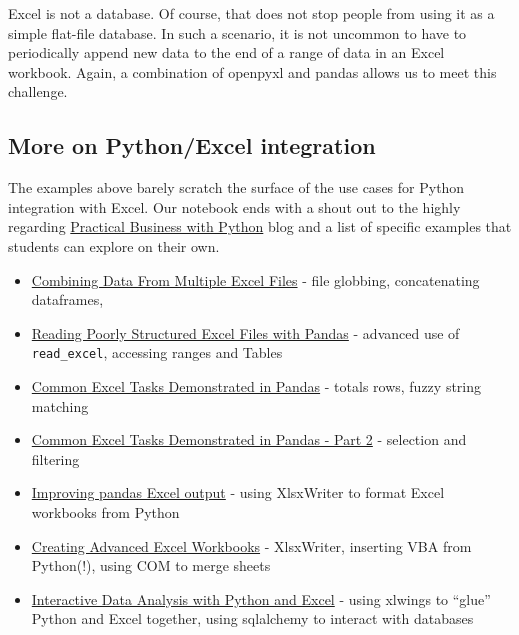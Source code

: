 \documentclass[ited,blindrev]{informs3}              %
\begin{document}
Excel is not a database. Of course, that does not stop people from using it as a simple flat-file database. In such a scenario, it is not uncommon to have to periodically append new data to the end of a range of data in an Excel workbook. Again, a combination of openpyxl and pandas allows us to meet this challenge.

\subsection{More on Python/Excel integration}

The examples above barely scratch the surface of the use cases for Python integration with Excel. Our notebook ends with a shout out to the highly regarding \href{https://pbpython.com/}{Practical Business with Python} blog and a list of specific examples that students can explore on their own.

\begin{itemize}
	\item
	\href{https://pbpython.com/excel-file-combine.html}{Combining Data
		From Multiple Excel Files} - file globbing, concatenating dataframes,
	\item
	\href{https://pbpython.com/pandas-excel-range.html}{Reading Poorly
		Structured Excel Files with Pandas} - advanced use of
	\texttt{read\_excel}, accessing ranges and Tables
	\item
	\href{https://pbpython.com/excel-pandas-comp.html}{Common Excel Tasks
		Demonstrated in Pandas} - totals rows, fuzzy string matching
	\item
	\href{https://pbpython.com/excel-pandas-comp-2.html}{Common Excel
		Tasks Demonstrated in Pandas - Part 2} - selection and filtering
	\item
	\href{https://pbpython.com/improve-pandas-excel-output.html}{Improving
		pandas Excel output} - using XlsxWriter to format Excel workbooks from
	Python
	\item
	\href{https://pbpython.com/advanced-excel-workbooks.html}{Creating
		Advanced Excel Workbooks} - XlsxWriter, inserting VBA from Python(!),
	using COM to merge sheets
	\item
	\href{https://pbpython.com/xlwings-pandas-excel.html}{Interactive Data
		Analysis with Python and Excel} - using xlwings to ``glue'' Python and
	Excel together, using sqlalchemy to interact with databases
\end{itemize}

\end{document}
